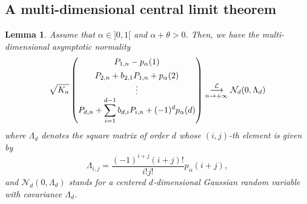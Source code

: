 \documentclass[twoside,12pt]{article}
\newcommand{\cL}{\mathcal{L}}
\newcommand{\cN}{\mathcal{N}}
\newtheorem{lem}[thm]{Lemma}
\begin{document}

\subsection{A multi-dimensional central limit theorem} 
\label{Sub-MCLT}


\begin{lem}
\label{L-MATRIXCLT}
Assume that $\alpha\in]0,1[$ and  $\alpha+\theta>0$. Then, we have 
the multi-dimensional asymptotic normality
\begin{equation}
\label{MCLT}
\sqrt{K_{n}} 
\begin{pmatrix}
P_{1,n} -p_{\alpha}(1) \vspace{1ex}\\
P_{2,n} +b_{2,1} P_{1,n} + p_{\alpha}(2) \\
\vdots\\
\displaystyle{P_{d,n}  + \sum_{i=1}^{d-1}b_{d,i}P_{i,n} +(-1)^d p_{\alpha}(d)}
\end{pmatrix}
\underset{n\rightarrow+\infty}{\overset{\cL}{\longrightarrow}} \cN_d(0, \Lambda_d)
\end{equation}
where $\Lambda_d$ denotes the square matrix of order $d$ whose $(i,j)$-th element is given by
\begin{equation}
\label{Lambdaij}
\Lambda_{i,j}=\frac{(-1)^{i+j} (i+j)!}{i!j!}p_\alpha(i+j),
\end{equation}
and $ \cN_d(0, \Lambda_d)$ stands for a centered $d$-dimensional Gaussian random variable with covariance $\Lambda_d$.
\end{lem}
\end{document}
